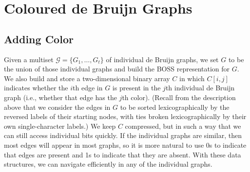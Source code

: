 \chapter{Coloured de Bruijn Graphs}

\section{Adding Color}
\label{subsec:color}

Given a multiset \(\mathcal{G} = \{G_1, \ldots, G_t\}\) of individual de Bruijn graphs, we set $G$ to be the union of those individual graphs and build the BOSS representation for $G$.  We also build and store a two-dimensional binary array $C$ in which \(C [i, j]\) indicates whether the $i$th edge in $G$ is present in the $j$th individual de Bruijn graph (i.e., whether that edge has the $j$th color). 
(Recall from the description above that we consider the edges in $G$ to be sorted lexicographically by the reversed labels of their starting nodes, with ties broken lexicographically by their own single-character labels.)  
We keep $C$ compressed, but in such a way that we can still access individual bits quickly.  If the individual graphs are similar, then most edges will appear in most graphs, so it is more natural to use 0s to indicate that edges are present and 1s to indicate that they are absent.  With these data structures, we can navigate efficiently in any of the individual graphs.


